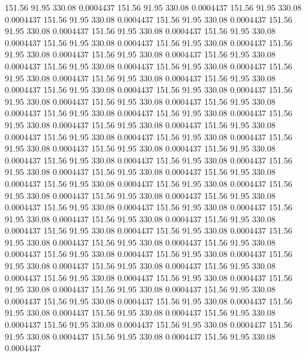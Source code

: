  151.56   91.95  330.08   0.0004437
 151.56   91.95  330.08   0.0004437
 151.56   91.95  330.08   0.0004437
 151.56   91.95  330.08   0.0004437
 151.56   91.95  330.08   0.0004437
 151.56   91.95  330.08   0.0004437
 151.56   91.95  330.08   0.0004437
 151.56   91.95  330.08   0.0004437
 151.56   91.95  330.08   0.0004437
 151.56   91.95  330.08   0.0004437
 151.56   91.95  330.08   0.0004437
 151.56   91.95  330.08   0.0004437
 151.56   91.95  330.08   0.0004437
 151.56   91.95  330.08   0.0004437
 151.56   91.95  330.08   0.0004437
 151.56   91.95  330.08   0.0004437
 151.56   91.95  330.08   0.0004437
 151.56   91.95  330.08   0.0004437
 151.56   91.95  330.08   0.0004437
 151.56   91.95  330.08   0.0004437
 151.56   91.95  330.08   0.0004437
 151.56   91.95  330.08   0.0004437
 151.56   91.95  330.08   0.0004437
 151.56   91.95  330.08   0.0004437
 151.56   91.95  330.08   0.0004437
 151.56   91.95  330.08   0.0004437
 151.56   91.95  330.08   0.0004437
 151.56   91.95  330.08   0.0004437
 151.56   91.95  330.08   0.0004437
 151.56   91.95  330.08   0.0004437
 151.56   91.95  330.08   0.0004437
 151.56   91.95  330.08   0.0004437
 151.56   91.95  330.08   0.0004437
 151.56   91.95  330.08   0.0004437
 151.56   91.95  330.08   0.0004437
 151.56   91.95  330.08   0.0004437
 151.56   91.95  330.08   0.0004437
 151.56   91.95  330.08   0.0004437
 151.56   91.95  330.08   0.0004437
 151.56   91.95  330.08   0.0004437
 151.56   91.95  330.08   0.0004437
 151.56   91.95  330.08   0.0004437
 151.56   91.95  330.08   0.0004437
 151.56   91.95  330.08   0.0004437
 151.56   91.95  330.08   0.0004437
 151.56   91.95  330.08   0.0004437
 151.56   91.95  330.08   0.0004437
 151.56   91.95  330.08   0.0004437
 151.56   91.95  330.08   0.0004437
 151.56   91.95  330.08   0.0004437
 151.56   91.95  330.08   0.0004437
 151.56   91.95  330.08   0.0004437
 151.56   91.95  330.08   0.0004437
 151.56   91.95  330.08   0.0004437
 151.56   91.95  330.08   0.0004437
 151.56   91.95  330.08   0.0004437
 151.56   91.95  330.08   0.0004437
 151.56   91.95  330.08   0.0004437
 151.56   91.95  330.08   0.0004437
 151.56   91.95  330.08   0.0004437
 151.56   91.95  330.08   0.0004437
 151.56   91.95  330.08   0.0004437
 151.56   91.95  330.08   0.0004437
 151.56   91.95  330.08   0.0004437
 151.56   91.95  330.08   0.0004437
 151.56   91.95  330.08   0.0004437
 151.56   91.95  330.08   0.0004437
 151.56   91.95  330.08   0.0004437
 151.56   91.95  330.08   0.0004437
 151.56   91.95  330.08   0.0004437
 151.56   91.95  330.08   0.0004437
 151.56   91.95  330.08   0.0004437
 151.56   91.95  330.08   0.0004437

